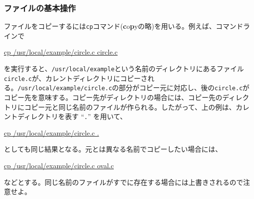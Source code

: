 \subsubsection*{ファイルの基本操作}
ファイルをコピーするには{\tt cp}コマンド({\bf c}o{\bf p}yの略)を用いる。例えば、コマンドラインで
\begin{commandline2}
\prompt \underline{cp /usr/local/example/circle.c circle.c}
\end{commandline2} \noindent
を実行すると、{\tt /usr/local/example}という名前のディレクトリにあるファイル{\tt circle.c}が、カレントディレクトリにコピーされる。{\tt /usr/local/example/circle.c}の部分がコピー元に対応し、後の{\tt circle.c}がコピー先を意味する。コピー先がディレクトリの場合には、コピー先のディレクトリにコピー元と同じ名前のファイルが作られる。したがって、上の例は、カレントディレクトリを表す ``{\tt .}'' を用いて、
\begin{commandline2}
\prompt \underline{cp /usr/local/example/circle.c .}
\end{commandline2} \noindent
としても同じ結果となる。元とは異なる名前でコピーしたい場合には、
\begin{commandline2}
\prompt \underline{cp /usr/local/example/circle.c oval.c}
\end{commandline2} \noindent
などとする。同じ名前のファイルがすでに存在する場合には上書きされるので注意せよ。

